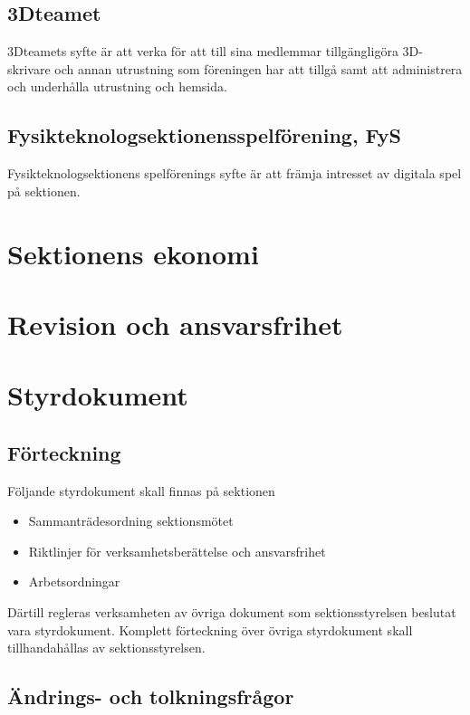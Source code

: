 \documentclass[11pt,a4paper]{article}
\begin{document}
\subsection{3Dteamet}
3Dteamets syfte är att verka för att till sina medlemmar tillgängligöra 3D-skrivare och annan utrustning som föreningen har att tillgå samt att administrera och underhålla utrustning och hemsida.

\subsection{Fysikteknologsektionensspelförening, FyS}
Fysikteknologsektionens spelförenings syfte är att främja intresset av digitala spel på sektionen.

\newpage

\section{Sektionens ekonomi}

\section{Revision och ansvarsfrihet}

\section{Styrdokument}
\subsection{Förteckning}
Följande styrdokument skall finnas på sektionen

\begin{itemize}
\item Sammanträdesordning sektionsmötet
\item Riktlinjer för verksamhetsberättelse och ansvarsfrihet
\item Arbetsordningar
\end{itemize}

Därtill regleras verksamheten av övriga dokument som sektionsstyrelsen beslutat vara styrdokument. Komplett förteckning över övriga styrdokument skall tillhandahållas av sektionsstyrelsen.

\subsection{Ändrings- och tolkningsfrågor}
\end{document}
